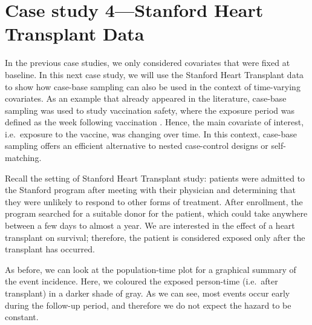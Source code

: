 \documentclass[
]{jss}
\begin{document}
\hypertarget{case-study-4stanford-heart-transplant-data}{%
\section{Case study 4---Stanford Heart Transplant
Data}\label{case-study-4stanford-heart-transplant-data}}

In the previous case studies, we only considered covariates that were
fixed at baseline. In this next case study, we will use the Stanford
Heart Transplant data
\citep[\citet{crowley1977covariance}]{clark1971cardiac} to show how
case-base sampling can also be used in the context of time-varying
covariates. As an example that already appeared in the literature,
case-base sampling was used to study vaccination safety, where the
exposure period was defined as the week following vaccination
\citep{saarela2015case}. Hence, the main covariate of interest,
i.e.~exposure to the vaccine, was changing over time. In this context,
case-base sampling offers an efficient alternative to nested
case-control designs or self-matching.

Recall the setting of Stanford Heart Transplant study: patients were
admitted to the Stanford program after meeting with their physician and
determining that they were unlikely to respond to other forms of
treatment. After enrollment, the program searched for a suitable donor
for the patient, which could take anywhere between a few days to almost
a year. We are interested in the effect of a heart transplant on
survival; therefore, the patient is considered exposed only after the
transplant has occurred.

As before, we can look at the population-time plot for a graphical
summary of the event incidence. Here, we coloured the exposed
person-time (i.e.~after transplant) in a darker shade of gray. As we can
see, most events occur early during the follow-up period, and therefore
we do not expect the hazard to be constant.
\end{document}
